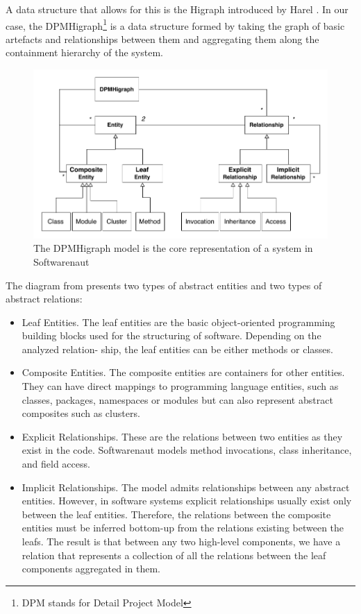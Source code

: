 \documentclass[preprint,12pt]{elsarticle}
\begin{document}
A data structure that allows for this is the Higraph introduced by Harel \cite{harel-visform}. In our case, the DPMHigraph\footnote{DPM stands for Detail Project Model} is a data structure formed by taking the graph of basic artefacts and relationships between them and aggregating them along the containment hierarchy of the system. 

\begin{figure}[h]
\begin{center}
\includegraphics[width=0.7\linewidth]{images/HigraphModel}
\caption{The DPMHigraph model is the core representation of a system in Softwarenaut}
\end{center}
\end{figure}


The diagram from  presents two types of abstract entities and two types of abstract relations:
\begin{itemize}
\item Leaf Entities. The leaf entities are the basic object-oriented programming building blocks used for the structuring of software. Depending on the analyzed relation- ship, the leaf entities can be either methods or classes.
\item Composite Entities. The composite entities are containers for other entities. They can have direct mappings to programming language entities, such as classes, packages, namespaces or modules but can also represent abstract composites such as clusters.
\item Explicit Relationships. These are the relations between two entities as they exist in the code. Softwarenaut models method invocations, class inheritance, and field access.
\item Implicit Relationships. The model admits relationships between any abstract entities. However, in software systems explicit relationships usually exist only between the leaf entities. Therefore, the relations between the composite entities must be inferred bottom-up from the relations existing between the leafs. The result is that between any two high-level components, we have a relation that represents a collection of all the relations between the leaf components aggregated in them.
\end{itemize}
\end{document}
